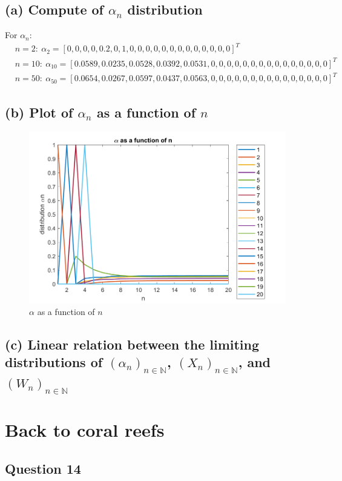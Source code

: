 \documentclass{article}
\begin{document}
    \subsection*{(a)  Compute of \( \alpha_n \) distribution }
    For \( \alpha_n \):
    \[
        \begin{aligned}
            &n = 2: \ \alpha_2 = [0, 0, 0, 0, 0.2, 0, 1, 0, 0, 0, 0, 0, 0, 0, 0, 0, 0, 0, 0, 0]^{T} \\
            &n = 10: \ \alpha_{10} = [0.0589, 0.0235, 0.0528, 0.0392, 0.0531, 0, 0, 0, 0, 0, 0, 0, 0, 0, 0, 0, 0, 0, 0, 0]^{T}\\
            &n = 50: \ \alpha_{50} = [0.0654, 0.0267, 0.0597, 0.0437, 0.0563, 0, 0, 0, 0, 0, 0, 0, 0, 0, 0, 0, 0, 0, 0, 0]^{T}
        \end{aligned}
    \]
    \subsection*{(b) Plot of \( \alpha_n \) as a function of \( n \)}
    \begin{figure}[h]
        \centering
        \includegraphics[width=0.7\linewidth]{plot_alpha_n.png}
        \caption{\label{fig:evo} $\alpha$ as a function of $n$}
    \end{figure}
    \subsection*{(c) Linear relation between the limiting distributions of $(\alpha_n)_{n \in \mathbb{N}}$, $(X_n)_{n \in \mathbb{N}}$, and $(W_n)_{n \in \mathbb{N}}$}

    \section*{Back to coral reefs}
    \subsection*{Question 14}
    
\end{document}
